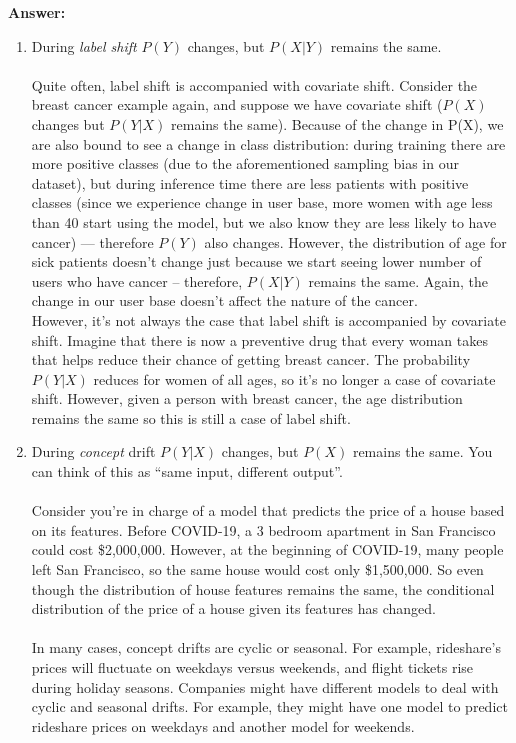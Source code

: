 \documentclass{article}
\newenvironment{QandA}{\begin{enumerate}[label=\arabic*.]}{\end{enumerate}}
\newenvironment{InnerQandA}{\begin{enumerate}[label=\roman*.]}{\end{enumerate}}
\newenvironment{ListAlph}{\begin{enumerate}[label=(\alph*)]}{\end{enumerate}}
\newenvironment{answer}{\par\normalfont \textbf{Answer:}}{}
\newcommand{\g}{\vert}
\begin{document}
\begin{QandA}
\begin{InnerQandA}
\begin{answer}
\begin{ListAlph}
            \item During \textit{label shift} $P(Y)$ changes, but $P(X \g Y)$ remains the same.  \\\\
            Quite often, label shift is accompanied with covariate shift. Consider the breast cancer example again, and suppose we have covariate shift ($P(X)$ changes but $P(Y \g X)$ remains the same). Because of the change in P(X), we are also bound to see a change in class distribution: during training there are more positive classes (due to the aforementioned sampling bias in our dataset), but during inference time there are less patients with positive classes (since we experience change in user base, more women with age less than 40 start using the model, but we also know they are less likely to have cancer) — therefore $P(Y)$ also changes. However, the distribution of age for sick patients doesn't change just because we start seeing  lower number of users who have cancer -- therefore, $P(X \g Y)$ remains the same. Again, the change in our user base doesn't affect the nature of the cancer. \\
            
            However, it’s not always the case that label shift is accompanied by covariate shift. Imagine that there is now a preventive drug that every woman takes that helps reduce their chance of getting breast cancer. The probability $P(Y \g X)$ reduces for women of all ages, so it’s no longer a case of covariate shift. However, given a person with breast cancer, the age distribution remains the same so this is still a case of label shift.\\
            
            \item During \textit{concept} drift $P(Y \g X)$ changes, but $P(X)$ remains the same. You can think of this as “same input, different output”. \\\\
            Consider you’re in charge of a model that predicts the price of a house based on its features. Before COVID-19, a 3 bedroom apartment in San Francisco could cost \$2,000,000. However, at the beginning of COVID-19, many people left San Francisco, so the same house would cost only \$1,500,000. So even though the distribution of house features remains the same, the conditional distribution of the price of a house given its features has changed.\\\\
            In many cases, concept drifts are cyclic or seasonal. For example, rideshare’s prices will fluctuate on weekdays versus weekends, and flight tickets rise during holiday seasons. Companies might have different models to deal with cyclic and seasonal drifts. For example, they might have one model to predict rideshare prices on weekdays and another model for weekends.
            

\end{ListAlph}
\end{answer}
\end{InnerQandA}
\end{QandA}
\end{document}
